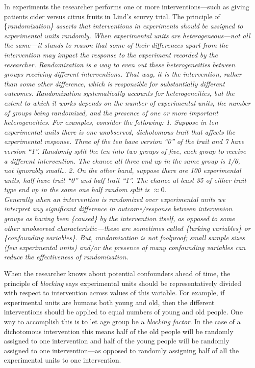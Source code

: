 \documentclass[]{book}
\begin{document}
In experiments the researcher performs one or more interventions---such
as giving patients cider versus citrus fruits in Lind's scurvy trial.
The principle of \{\em randomization\} asserts that interventions in
experiments should be assigned to experimental units randomly. When
experimental units are heterogeneous---not all the same---it stands to
reason that some of their differences apart from the intervention may
impact the response to the experiment recorded by the researcher.
Randomization is a way to even out these heterogeneities between groups
receiving different interventions. That way, it is the intervention,
rather than some other difference, which is responsible for
substantially different outcomes. Randomization systematically accounts
for heterogeneities, but the extent to which it works depends on the
number of experimental units, the number of groups being randomized, and
the presence of one or more important heterogeneities. For examples,
consider the following: 1. Suppose in ten experimental units there is
one unobserved, dichotomous trait that affects the experimental
response. Three of the ten have version ``0'' of the trait and 7 have
version ``1''. Randomly split the ten into two groups of five, each
group to receive a different intervention. The chance all three end up
in the same group is 1/6, not ignorably small\ldots{} 2. On the other
hand, suppose there are 100 experimental units, half have trait ``0''
and half trait ``1''. The chance at least 35 of either trait type end up
in the same one half random split is \(\approx 0\).\\
Generally when an intervention is randomized over experimental units we
interpret any significant difference in outcome/response between
intervenion groups as having been \{\em caused\} by the intervention
itself, as opposed to some other unobserved characteristic---these are
sometimes called \{\em lurking variables\} or
\{\em confounding variables\}. But, randomization is not foolproof;
small sample sizes (few experimental units) and/or the presence of many
confounding variables can reduce the effectiveness of randomization.

When the researcher knows about potential confounders ahead of time, the
principle of \emph{blocking} says experimental units should be
representatively divided with respect to intervention across values of
this variable. For example, if experimental units are humans both young
and old, then the different interventions should be applied to equal
numbers of young and old people. One way to accomplish this is to let
age group be a \emph{blocking factor}. In the case of a dichotomous
intervention this means half of the old people will be randomly assigned
to one intervention and half of the young people will be randomly
assigned to one intervention---as opposed to randomly assigning half of
all the experimental units to one intervention.
\end{document}
